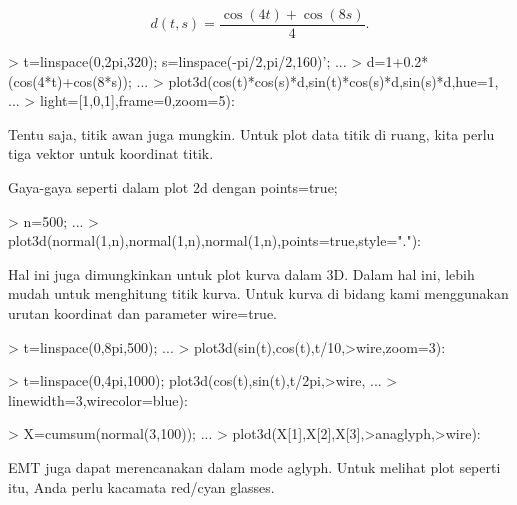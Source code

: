 \documentclass[a4paper,10pt]{article}
\begin{document}
\begin{eulernotebook}
\begin{eulercomment}
\begin{eulercomment}
\begin{eulercomment}
\end{eulercomment}
\begin{eulerformula}
\[
d(t,s) = \frac{\cos(4t)+\cos(8s)}{4}.
\]
\end{eulerformula}
\begin{eulerprompt}
> t=linspace(0,2pi,320); s=linspace(-pi/2,pi/2,160)'; ...
> d=1+0.2*(cos(4*t)+cos(8*s)); ...
> plot3d(cos(t)*cos(s)*d,sin(t)*cos(s)*d,sin(s)*d,hue=1, ...
>   light=[1,0,1],frame=0,zoom=5):
\end{eulerprompt}
\begin{eulercomment}
Tentu saja, titik awan juga mungkin. Untuk plot data titik di ruang,
kita perlu tiga vektor untuk koordinat titik.

Gaya-gaya seperti dalam plot 2d dengan points=true;
\end{eulercomment}
\begin{eulerprompt}
> n=500;  ...
>   plot3d(normal(1,n),normal(1,n),normal(1,n),points=true,style="."):
\end{eulerprompt}
\begin{eulercomment}
Hal ini juga dimungkinkan untuk plot kurva dalam 3D. Dalam hal ini,
lebih mudah untuk menghitung titik kurva. Untuk kurva di bidang kami
menggunakan urutan koordinat dan parameter wire=true.
\end{eulercomment}
\begin{eulerprompt}
> t=linspace(0,8pi,500); ...
> plot3d(sin(t),cos(t),t/10,>wire,zoom=3):
\end{eulerprompt}
\begin{eulerprompt}
> t=linspace(0,4pi,1000); plot3d(cos(t),sin(t),t/2pi,>wire, ...
> linewidth=3,wirecolor=blue):
\end{eulerprompt}
\begin{eulerprompt}
> X=cumsum(normal(3,100)); ...
>  plot3d(X[1],X[2],X[3],>anaglyph,>wire):
\end{eulerprompt}
\begin{eulercomment}
EMT juga dapat merencanakan dalam mode aglyph. Untuk melihat plot
seperti itu, Anda perlu kacamata red/cyan glasses.
\end{eulercomment}
\begin{eulerprompt}

\end{eulerprompt}
\end{eulercomment}
\end{eulercomment}
\end{eulernotebook}
\end{document}
